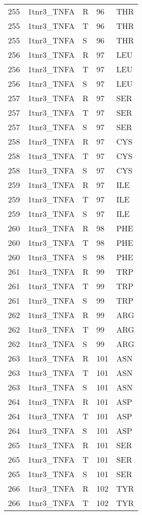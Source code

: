 \begin{longtable}[l]{l|l|l|l|l}
	255 & 1tnr3_TNFA & R & 96 & THR \\
	255 & 1tnr3_TNFA & T & 96 & THR \\
	255 & 1tnr3_TNFA & S & 96 & THR \\
	256 & 1tnr3_TNFA & R & 97 & LEU \\
	256 & 1tnr3_TNFA & T & 97 & LEU \\
	256 & 1tnr3_TNFA & S & 97 & LEU \\
	257 & 1tnr3_TNFA & R & 97 & SER \\
	257 & 1tnr3_TNFA & T & 97 & SER \\
	257 & 1tnr3_TNFA & S & 97 & SER \\
	258 & 1tnr3_TNFA & R & 97 & CYS \\
	258 & 1tnr3_TNFA & T & 97 & CYS \\
	258 & 1tnr3_TNFA & S & 97 & CYS \\
	259 & 1tnr3_TNFA & R & 97 & ILE \\
	259 & 1tnr3_TNFA & T & 97 & ILE \\
	259 & 1tnr3_TNFA & S & 97 & ILE \\
	260 & 1tnr3_TNFA & R & 98 & PHE \\
	260 & 1tnr3_TNFA & T & 98 & PHE \\
	260 & 1tnr3_TNFA & S & 98 & PHE \\
	261 & 1tnr3_TNFA & R & 99 & TRP \\
	261 & 1tnr3_TNFA & T & 99 & TRP \\
	261 & 1tnr3_TNFA & S & 99 & TRP \\
	262 & 1tnr3_TNFA & R & 99 & ARG \\
	262 & 1tnr3_TNFA & T & 99 & ARG \\
	262 & 1tnr3_TNFA & S & 99 & ARG \\
	263 & 1tnr3_TNFA & R & 101 & ASN \\
	263 & 1tnr3_TNFA & T & 101 & ASN \\
	263 & 1tnr3_TNFA & S & 101 & ASN \\
	264 & 1tnr3_TNFA & R & 101 & ASP \\
	264 & 1tnr3_TNFA & T & 101 & ASP \\
	264 & 1tnr3_TNFA & S & 101 & ASP \\
	265 & 1tnr3_TNFA & R & 101 & SER \\
	265 & 1tnr3_TNFA & T & 101 & SER \\
	265 & 1tnr3_TNFA & S & 101 & SER \\
	266 & 1tnr3_TNFA & R & 102 & TYR \\
	266 & 1tnr3_TNFA & T & 102 & TYR \\

\end{longtable}
